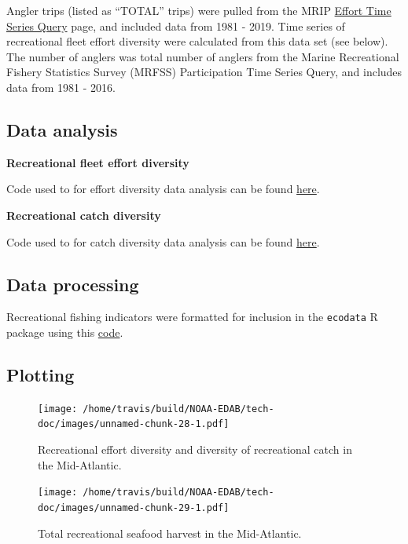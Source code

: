 \documentclass[
]{book}
\begin{document}
Angler trips (listed as ``TOTAL'' trips) were pulled from the MRIP \href{https://www.st.nmfs.noaa.gov/recreational-fisheries/data-and-documentation/run-a-data-query}{Effort Time Series Query} page, and included data from 1981 - 2019. Time series of recreational fleet effort diversity were calculated from this data set (see below). The number of anglers was total number of anglers from the Marine Recreational Fishery Statistics Survey (MRFSS) Participation Time Series Query, and includes data from 1981 - 2016.

\hypertarget{data-analysis-27}{%
\subsection{Data analysis}\label{data-analysis-27}}

\textbf{Recreational fleet effort diversity}

Code used to for effort diversity data analysis can be found \href{https://github.com/NOAA-EDAB/tech-doc/blob/master/R/stored_scripts/rec_effort_div_analysis.R}{here}.

\textbf{Recreational catch diversity}

Code used to for catch diversity data analysis can be found \href{https://github.com/NOAA-EDAB/tech-doc/blob/master/R/stored_scripts/rec_catch_div_analysis.R}{here}.

\hypertarget{data-processing-20}{%
\subsection{Data processing}\label{data-processing-20}}

Recreational fishing indicators were formatted for inclusion in the \texttt{ecodata} R package using this \href{https://github.com/NOAA-EDAB/ecodata/blob/master/data-raw/get_rec.R}{code}.

\hypertarget{plotting-22}{%
\subsection{Plotting}\label{plotting-22}}

\begin{figure}
\centering
\texttt{[image: /home/travis/build/NOAA-EDAB/tech-doc/images/unnamed-chunk-28-1.pdf]}
\caption{\label{fig:unnamed-chunk-28}Recreational effort diversity and diversity of recreational catch in the Mid-Atlantic.}
\end{figure}

\begin{figure}
\centering
\texttt{[image: /home/travis/build/NOAA-EDAB/tech-doc/images/unnamed-chunk-29-1.pdf]}
\caption{\label{fig:unnamed-chunk-29}Total recreational seafood harvest in the Mid-Atlantic.}
\end{figure}
\end{document}
